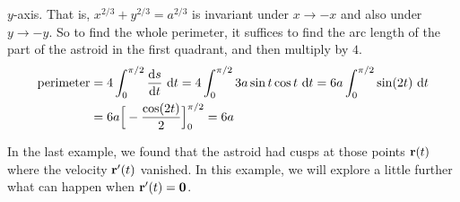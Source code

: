 \begin{eg}
\begin{itemize}
$y$-axis. That is, $x^{2/3}+y^{2/3} = a^{2/3}$ is invariant under $x\rightarrow -x$ 
and also under $y\rightarrow -y$. So to find the whole perimeter, it suffices to find the 
arc length of the part of the astroid in the first quadrant, and then multiply by $4$.
\begin{align*}
\text{perimeter}
&=4\int_0^{\pi/2}\diff{s}{t}\ \dee{t}
 = 4\int_0^{\pi/2}3a\sin t\cos t\ \dee{t}
 = 6a\int_0^{\pi/2}\sin(2t)\ \dee{t} \\
 &=6a\Big[-\frac{\cos(2t)}{2}\Big]_0^{\pi/2}
=6a
\end{align*}
\end{itemize}

\end{eg}


\begin{eg}[$\vr'(t)=\vZero$]\label{eg:zeroSpeed}
In the last example, we found that the astroid  had
cusps at those points $\mathbf{r}(t)$ where the velocity $\mathbf{r}'(t)$ vanished.
In this example, we will explore a little further what can happen when
$\vr'(t)=\vZero$. 


\end{eg}
